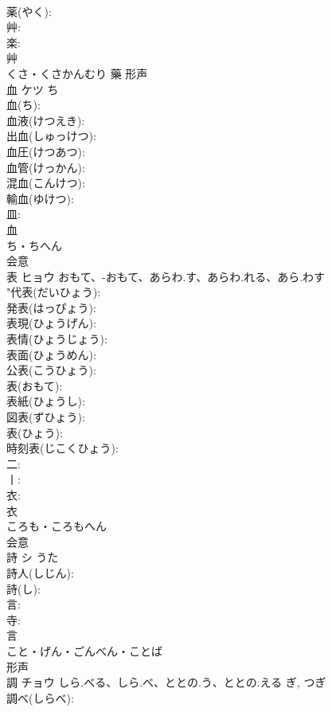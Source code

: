 \documentclass[8pt]{extreport}
\begin{document}
\begin{CJK}{UTF8}{min}
\\	薬(やく): 
\\	艸: 
\\	楽: 
\\	艸	
\\	くさ・くさかんむり	藥	形声 
\\	血	ケツ	ち		
\\	血(ち): 
\\	血液(けつえき): 
\\	出血(しゅっけつ): 
\\	血圧(けつあつ): 
\\	血管(けっかん): 
\\	混血(こんけつ): 
\\	輸血(ゆけつ): 
\\	皿: 
\\	血	
\\	ち・ちへん	
\\	会意 
\\	表	ヒョウ	おもて、-おもて、あらわ.す、あらわ.れる、あら.わす		
\\	"代表(だいひょう): 
\\	発表(はっぴょう): 
\\	表現(ひょうげん): 
\\	表情(ひょうじょう): 
\\	表面(ひょうめん): 
\\	公表(こうひょう): 
\\	表(おもて): 
\\	表紙(ひょうし): 
\\	図表(ずひょう): 
\\	表(ひょう): 
\\	時刻表(じこくひょう): 
\\	二: 
\\	丨: 
\\	衣: 
\\	衣	
\\	ころも・ころもへん	
\\	会意 
\\	詩	シ	うた		
\\	詩人(しじん): 
\\	詩(し): 
\\	言: 
\\	寺: 
\\	言	
\\	こと・げん・ごんべん・ことば	
\\	形声 
\\	調	チョウ	しら.べる、しら.べ、ととの.う、ととの.える	ぎ, つぎ	
\\	調べ(しらべ): 

\end{CJK}
\end{document}
